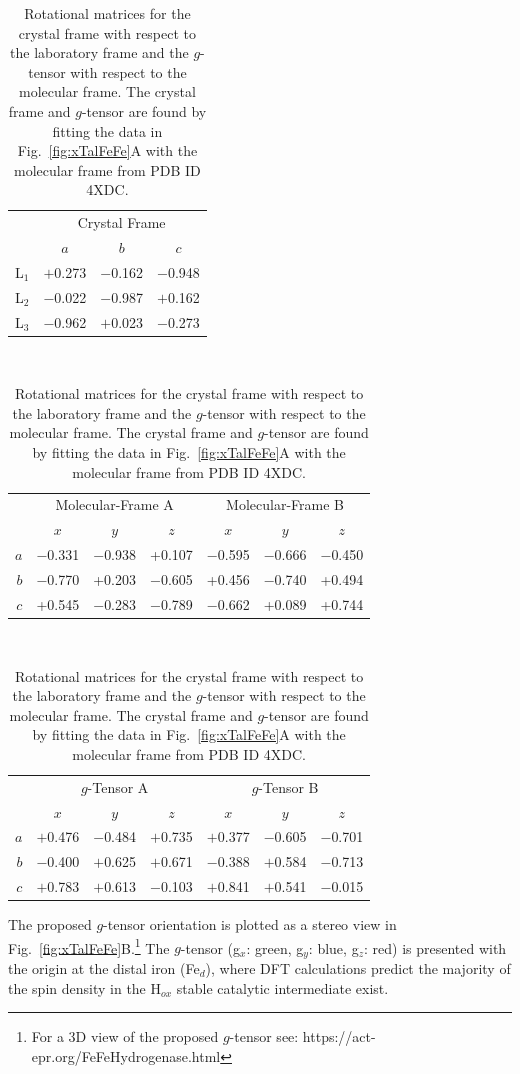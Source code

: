 \begin{table}[htbp]
\caption[Rotational matrices for the crystal frame.]{Rotational matrices  for the crystal frame with respect to the laboratory frame and the $g$-tensor with respect to the molecular frame. The crystal frame and $g$-tensor are found by fitting the data in Fig.~\ref{fig:xTalFeFe}A with the molecular frame from PDB ID 4XDC.}
\centering
\hspace{-12.825em}
\begin{tabular}{r|ccc}
 & \multicolumn{3}{c}{Crystal Frame} \\
\multicolumn{1}{l|}{} & $a$ & $b$ & $c$ \\ \hline \hline
L$_1$ & $+$0.273 & $-$0.162 & $-$0.948 \\
L$_2$ & $-$0.022 & $-$0.987 & $+$0.162 \\
L$_3$ & $-$0.962 & $+$0.023 & $-$0.273
\end{tabular}\label{table:frames} \\
\vspace{0.5cm}
\begin{tabular}{r|ccc|ccc}
 & \multicolumn{3}{c|}{Molecular-Frame A} & \multicolumn{3}{c}{Molecular-Frame B} \\
 & $x$ & $y$ & $z$ & $x$ & $y$ & $z$ \\ \hline \hline
$a$ & $-$0.331 & $-$0.938 & +0.107 & $-$0.595 & $-$0.666 & $-$0.450 \\
$b$ & $-$0.770 & +0.203 & $-$0.605 & +0.456 & $-$0.740 & +0.494 \\
$c$ & +0.545 & $-$0.283 & $-$0.789 & $-$0.662 & +0.089 & +0.744
\end{tabular}\\
\vspace{0.5cm}
\begin{tabular}{r|ccc|ccc}
 & \multicolumn{3}{c|}{$g$-Tensor A} & \multicolumn{3}{c}{$g$-Tensor B} \\
 & $x$ & $y$ & $z$ & $x$ & $y$ & $z$ \\ \hline \hline
$a$ & $+$0.476 & $-$0.484 & $+$0.735 & $+$0.377 & $-$0.605 & $-$0.701 \\
$b$ & $-$0.400 & $+$0.625 & $+$0.671 & $-$0.388 & $+$0.584 & $-$0.713 \\
$c$ & $+$0.783 & $+$0.613 & $-$0.103 & $+$0.841 & $+$0.541 & $-$0.015
\end{tabular}
\end{table}

The proposed $g$-tensor orientation is plotted as a stereo view in Fig.~\ref{fig:xTalFeFe}B.\footnote{For a 3D view of the proposed $g$-tensor see: https://act-epr.org/FeFeHydrogenase.html} The $g$-tensor (g$_x$: green, g$_y$: blue, g$_z$: red) is presented with the origin at the distal iron (Fe$_d$), where DFT calculations predict the majority of the spin density in the H$_{ox}$ stable catalytic intermediate exist. \cite{FiedlerDFT,GrecoDFT} 


